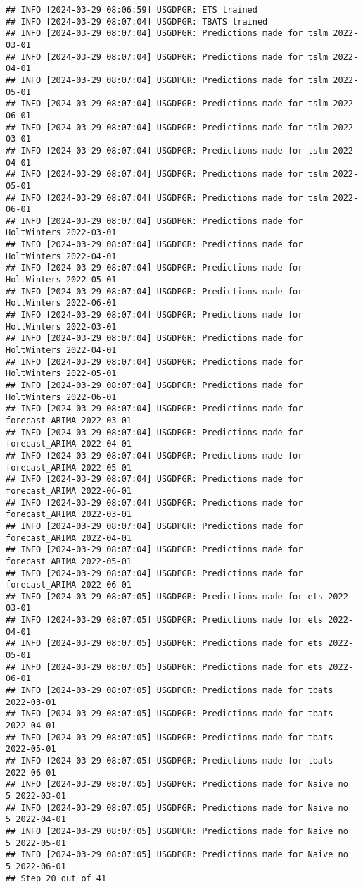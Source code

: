 \documentclass[
]{article}
\begin{document}
\begin{verbatim}
## INFO [2024-03-29 08:06:59] USGDPGR: ETS trained
## INFO [2024-03-29 08:07:04] USGDPGR: TBATS trained
## INFO [2024-03-29 08:07:04] USGDPGR: Predictions made for tslm 2022-03-01
## INFO [2024-03-29 08:07:04] USGDPGR: Predictions made for tslm 2022-04-01
## INFO [2024-03-29 08:07:04] USGDPGR: Predictions made for tslm 2022-05-01
## INFO [2024-03-29 08:07:04] USGDPGR: Predictions made for tslm 2022-06-01
## INFO [2024-03-29 08:07:04] USGDPGR: Predictions made for tslm 2022-03-01
## INFO [2024-03-29 08:07:04] USGDPGR: Predictions made for tslm 2022-04-01
## INFO [2024-03-29 08:07:04] USGDPGR: Predictions made for tslm 2022-05-01
## INFO [2024-03-29 08:07:04] USGDPGR: Predictions made for tslm 2022-06-01
## INFO [2024-03-29 08:07:04] USGDPGR: Predictions made for HoltWinters 2022-03-01
## INFO [2024-03-29 08:07:04] USGDPGR: Predictions made for HoltWinters 2022-04-01
## INFO [2024-03-29 08:07:04] USGDPGR: Predictions made for HoltWinters 2022-05-01
## INFO [2024-03-29 08:07:04] USGDPGR: Predictions made for HoltWinters 2022-06-01
## INFO [2024-03-29 08:07:04] USGDPGR: Predictions made for HoltWinters 2022-03-01
## INFO [2024-03-29 08:07:04] USGDPGR: Predictions made for HoltWinters 2022-04-01
## INFO [2024-03-29 08:07:04] USGDPGR: Predictions made for HoltWinters 2022-05-01
## INFO [2024-03-29 08:07:04] USGDPGR: Predictions made for HoltWinters 2022-06-01
## INFO [2024-03-29 08:07:04] USGDPGR: Predictions made for forecast_ARIMA 2022-03-01
## INFO [2024-03-29 08:07:04] USGDPGR: Predictions made for forecast_ARIMA 2022-04-01
## INFO [2024-03-29 08:07:04] USGDPGR: Predictions made for forecast_ARIMA 2022-05-01
## INFO [2024-03-29 08:07:04] USGDPGR: Predictions made for forecast_ARIMA 2022-06-01
## INFO [2024-03-29 08:07:04] USGDPGR: Predictions made for forecast_ARIMA 2022-03-01
## INFO [2024-03-29 08:07:04] USGDPGR: Predictions made for forecast_ARIMA 2022-04-01
## INFO [2024-03-29 08:07:04] USGDPGR: Predictions made for forecast_ARIMA 2022-05-01
## INFO [2024-03-29 08:07:04] USGDPGR: Predictions made for forecast_ARIMA 2022-06-01
## INFO [2024-03-29 08:07:05] USGDPGR: Predictions made for ets 2022-03-01
## INFO [2024-03-29 08:07:05] USGDPGR: Predictions made for ets 2022-04-01
## INFO [2024-03-29 08:07:05] USGDPGR: Predictions made for ets 2022-05-01
## INFO [2024-03-29 08:07:05] USGDPGR: Predictions made for ets 2022-06-01
## INFO [2024-03-29 08:07:05] USGDPGR: Predictions made for tbats 2022-03-01
## INFO [2024-03-29 08:07:05] USGDPGR: Predictions made for tbats 2022-04-01
## INFO [2024-03-29 08:07:05] USGDPGR: Predictions made for tbats 2022-05-01
## INFO [2024-03-29 08:07:05] USGDPGR: Predictions made for tbats 2022-06-01
## INFO [2024-03-29 08:07:05] USGDPGR: Predictions made for Naive no  5 2022-03-01
## INFO [2024-03-29 08:07:05] USGDPGR: Predictions made for Naive no  5 2022-04-01
## INFO [2024-03-29 08:07:05] USGDPGR: Predictions made for Naive no  5 2022-05-01
## INFO [2024-03-29 08:07:05] USGDPGR: Predictions made for Naive no  5 2022-06-01
## Step 20 out of 41
\end{verbatim}
\end{document}
